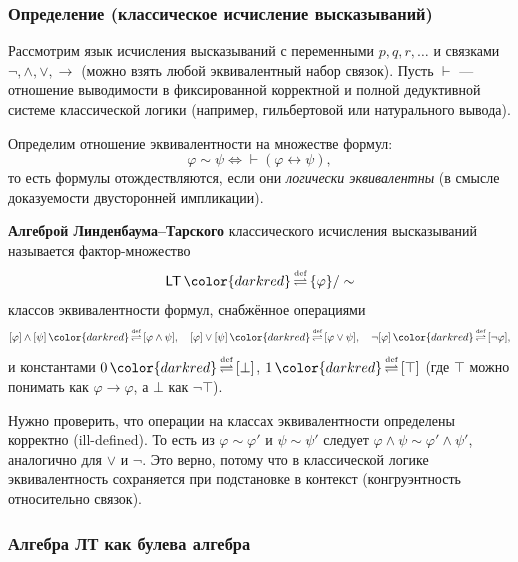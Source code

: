 \documentclass[11pt, a4paper]{extarticle}
\renewcommand{\eqdef}{\ifmmode{\,\color{darkred}\mathop{\overset{\text{\tiny def}}{\rightleftharpoons}}\,}\fi}%
\newcommand{\eqdef}{\,\mathop{\color{darkred}\overset{\text{\tiny def}}{\rightleftharpoons}}\,}
\begin{document}
\subsubsection{Определение (классическое исчисление высказываний)}

Рассмотрим язык исчисления высказываний с переменными $p,q,r,\dots$ и связками $\neg, \wedge, \vee, \to$ (можно взять любой эквивалентный набор связок). Пусть $\vdash$ --- отношение выводимости в фиксированной корректной и полной дедуктивной системе классической логики (например, гильбертовой или натурального вывода).

Определим отношение эквивалентности на множестве формул:
$$
\varphi \sim \psi \iff \vdash (\varphi \leftrightarrow \psi),
$$
то есть формулы отождествляются, если они \emph{логически эквивалентны} (в смысле доказуемости двусторонней импликации).

\begin{definition}
\textbf{Алгеброй Линденбаума--Тарского} классического исчисления высказываний называется фактор-множество
$$
\mathsf{LT} \eqdef \{\varphi\}/\sim
$$
классов эквивалентности формул, снабжённое операциями
$$
[\varphi]\wedge[\psi] \eqdef [\varphi\wedge\psi],\quad
[\varphi]\vee[\psi] \eqdef [\varphi\vee\psi],\quad
\neg[\varphi] \eqdef [\neg\varphi],
$$
и константами $0 \eqdef [\bot]$, $1 \eqdef [\top]$ (где $\top$ можно понимать как $\varphi\to\varphi$, а $\bot$ как $\neg\top$).
\end{definition}

\begin{remark}
Нужно проверить, что операции на классах эквивалентности определены корректно (ill-defined). То есть из $\varphi\sim\varphi'$ и $\psi\sim\psi'$ следует
$\varphi\wedge\psi \sim \varphi'\wedge\psi'$, аналогично для $\vee$ и $\neg$.
Это верно, потому что в классической логике эквивалентность сохраняется при подстановке в контекст (конгруэнтность относительно связок).
\end{remark}

\subsubsection{Алгебра ЛТ как булева алгебра}
\end{document}

